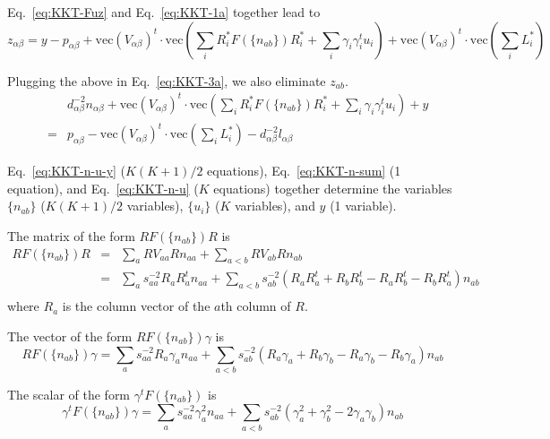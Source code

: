 \documentclass{article}
\newcommand*{\mvec}{\mathbf{\mathrm{vec}}}
\begin{document}
Eq.~\ref{eq:KKT-Fuz} and Eq.~\ref{eq:KKT-1a} together lead to
\begin{equation}
z_{\alpha\beta} = y - p_{\alpha\beta} + \mvec( V_{\alpha\beta})^t\cdot \mvec\left(\sum_i R_i^\ast F(\{ n_{ab}\}) R_i^\ast + \sum_i \gamma_i \gamma_i^t u_i\right) + \mvec(V_{\alpha\beta})^t\cdot \mvec\left(\sum_i L_i^\ast\right)
\end{equation}

Plugging the above in Eq.~\ref{eq:KKT-3a}, we also eliminate $z_{ab}$.
\begin{eqnarray}
&&d_{\alpha\beta}^{-2} n_{\alpha\beta} + \mvec(V_{\alpha\beta})^t\cdot
\mvec\left(\sum_i R_i^\ast F(\{ n_{ab} \}) R_i^\ast + \sum_i \gamma_i \gamma_i^t u_i\right) + y
\nonumber \\
&=& p_{\alpha\beta} - \mvec( V_{\alpha\beta})^t\cdot  
\mvec\left( \sum_i L_i^\ast \right) - d_{\alpha\beta}^{-2} l_{\alpha\beta}
\label{eq:KKT-n-u-y}
\end{eqnarray}

Eq.~\ref{eq:KKT-n-u-y} ($K(K+1)/2$ equations), Eq.~\ref{eq:KKT-n-sum}
(1 equation), and Eq.~\ref{eq:KKT-n-u} ($K$ equations) together
determine the variables $\{ n_{ab} \}$ ($K(K+1)/2$ variables), $\{ u_i
\}$ ($K$ variables), and $y$ (1 variable).

The matrix of the form $ R F(\{ n_{ab} \}) R$ is
\begin{eqnarray}
R F( \{ n_{ab} \}) R &=& \sum_a R V_{aa} R n_{aa} + \sum_{a<b} R V_{ab} R n_{ab}
\nonumber \\
&=& \sum_a s_{aa}^{-2} R_a R_a^t n_{aa} 
 + \sum_{a<b} s_{ab}^{-2} (R_a R_a^t + R_b R_b^t - R_a R_b^t - R_b R_a^t) n_{ab}
\nonumber \\
\end{eqnarray}
where $R_a$ is the column vector of the $a$th column of $R$.

The vector of the form $ R F(\{ n_{ab} \}) \gamma $ is
\begin{equation}
R F( \{ n_{ab} \}) \gamma = \sum_a s_{aa}^{-2} R_a \gamma_a n_{aa}
  + \sum_{a<b} s_{ab}^{-2} ( R_a \gamma_a + R_b \gamma_b - R_a \gamma_b - R_b \gamma_a) n_{ab}
\end{equation}

The scalar of the form $\gamma^t F(\{ n_{ab} \})$ is
\begin{equation}
\gamma^t F(\{ n_{ab} \}) \gamma = \sum_a s_{aa}^{-2} \gamma_a^2 n_{aa}
 + \sum_{a<b} s_{ab}^{-2} ( \gamma_a^2 + \gamma_b^2 - 2\gamma_a\gamma_b ) n_{ab}
\end{equation}
\end{document}
